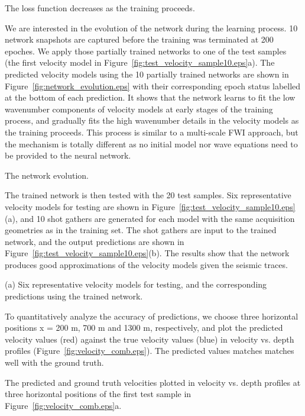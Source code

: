 \documentclass{segabs}
\begin{document}
{The loss function decreases as the training proceeds.}

We are interested in the evolution of the network during the learning process. 10 network snapshots are captured before the training was terminated at 200 epoches. We apply those partially trained networks to one of the test samples (the first velocity model in Figure~\ref{fig:test_velocity_sample10.eps}a). The predicted velocity models using the 10 partially trained networks are shown in Figure~\ref{fig:network_evolution.eps} with their corresponding epoch status labelled at the bottom of each prediction. It shows that the network learns to fit the low wavenumber components of velocity models at early stages of the training process, and gradually fits the high wavenumber details in the velocity models as the training proceeds. This process is similar to a multi-scale FWI approach, but the mechanism is totally different as no initial model nor wave equations need to be provided to the neural network.

{The network evolution.}

The trained network is then tested with the 20 test samples. Six representative velocity models for testing are shown in Figure~\ref{fig:test_velocity_sample10.eps}(a), and 10 shot gathers are generated for each model with the same acquisition geometries as in the training set. The shot gathers are input to the trained network, and the output predictions are shown in Figure~\ref{fig:test_velocity_sample10.eps}(b). The results show that the network produces good approximations of the velocity models given the seismic traces.

{(a) Six representative velocity models for testing, and the corresponding predictions using the trained network.}

To quantitatively analyze the accuracy of predictions, we choose three horizontal positions x = 200 m, 700 m and 1300 m, respectively, and plot the predicted velocity values (red) against the true velocity values (blue) in velocity vs. depth profiles (Figure~\ref{fig:velocity_comb.eps}). The predicted values matches matches well with the ground truth.

{The predicted and ground truth velocities plotted in velocity vs. depth profiles at three horizontal positions of the first test sample in Figure~\ref{fig:velocity_comb.eps}a}.
\end{document}
